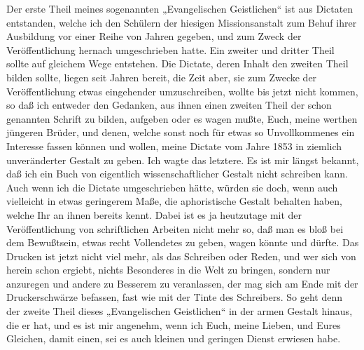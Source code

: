 Der erste Theil meines sogenannten „Evangelischen Geistlichen“ ist aus Dictaten entstanden, welche ich den Schülern der hiesigen Missionsanstalt zum Behuf ihrer Ausbildung vor einer Reihe von Jahren gegeben, und zum Zweck der Veröffentlichung hernach umgeschrieben hatte. Ein zweiter und dritter Theil sollte auf gleichem Wege entstehen. Die Dictate, deren Inhalt den zweiten Theil bilden sollte, liegen seit Jahren bereit, die Zeit aber, sie zum Zwecke der Veröffentlichung etwas eingehender umzuschreiben, wollte bis jetzt nicht kommen, so daß ich entweder den Gedanken, aus ihnen einen zweiten Theil der schon genannten Schrift zu bilden, aufgeben oder es wagen mußte, Euch, meine werthen jüngeren Brüder, und denen, welche sonst noch für etwas so Unvollkommenes ein Interesse fassen können und wollen, meine Dictate vom Jahre 1853 in ziemlich unveränderter Gestalt zu geben. Ich wagte das letztere. Es ist mir längst bekannt, daß ich ein Buch von eigentlich wissenschaftlicher Gestalt nicht schreiben kann. Auch wenn ich die Dictate umgeschrieben hätte, würden sie doch, wenn auch vielleicht in etwas geringerem Maße, die aphoristische Gestalt behalten haben, welche Ihr an ihnen bereits kennt. Dabei ist es ja heutzutage mit der Veröffentlichung von schriftlichen Arbeiten nicht mehr so, daß man es bloß bei dem Bewußtsein, etwas recht Vollendetes zu geben, wagen könnte und dürfte. Das Drucken ist jetzt nicht viel mehr, als das Schreiben oder Reden, und wer sich von herein schon ergiebt, nichts Besonderes in die Welt zu bringen, sondern nur anzuregen und andere zu Besserem zu veranlassen, der mag sich am Ende mit der Druckerschwärze befassen, fast wie mit der Tinte des Schreibers. So geht denn der zweite
Theil dieses „Evangelischen Geistlichen“ in der armen Gestalt hinaus, die er hat, und es ist mir angenehm, wenn ich Euch, meine Lieben, und Eures Gleichen, damit einen, sei es auch kleinen und geringen Dienst erwiesen habe.

